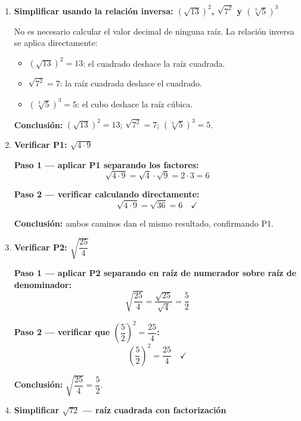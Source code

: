 \documentclass[11pt, letterpaper]{article}
\begin{document}
\begin{tcolorbox}[examplebox, title={Ejemplos}]
\begin{enumerate}[label=\textbf{Ej. \arabic*.}, leftmargin=*, itemsep=18pt]

\item \textbf{Simplificar usando la relación inversa: $(\sqrt{13})^2$, $\sqrt{7^2}$ y $(\sqrt[3]{5})^3$}

No es necesario calcular el valor decimal de ninguna raíz. La relación inversa se aplica directamente:

\medskip
\begin{itemize}[itemsep=4pt]
  \item $(\sqrt{13})^2 = 13$: \quad el cuadrado deshace la raíz cuadrada.
  \item $\sqrt{7^2} = 7$: \quad la raíz cuadrada deshace el cuadrado.
  \item $(\sqrt[3]{5})^3 = 5$: \quad el cubo deshace la raíz cúbica.
\end{itemize}

\textbf{Conclusión:} $(\sqrt{13})^2 = 13$; \quad $\sqrt{7^2} = 7$; \quad $(\sqrt[3]{5})^3 = 5$.

\item \textbf{Verificar P1: $\sqrt{4 \cdot 9}$}

\textbf{Paso 1 — aplicar P1 separando los factores:}
$$\sqrt{4 \cdot 9} = \sqrt{4} \cdot \sqrt{9} = 2 \cdot 3 = 6$$

\textbf{Paso 2 — verificar calculando directamente:}
$$\sqrt{4 \cdot 9} = \sqrt{36} = 6 \quad\checkmark$$

\textbf{Conclusión:} ambos caminos dan el mismo resultado, confirmando P1.

\item \textbf{Verificar P2: $\sqrt{\dfrac{25}{4}}$}

\textbf{Paso 1 — aplicar P2 separando en raíz de numerador sobre raíz de denominador:}
$$\sqrt{\frac{25}{4}} = \frac{\sqrt{25}}{\sqrt{4}} = \frac{5}{2}$$

\textbf{Paso 2 — verificar que $\left(\dfrac{5}{2}\right)^2 = \dfrac{25}{4}$:}
$$\left(\frac{5}{2}\right)^2 = \frac{25}{4} \quad\checkmark$$

\textbf{Conclusión:} $\sqrt{\dfrac{25}{4}} = \dfrac{5}{2}$.

\item \textbf{Simplificar $\sqrt{72}$ — raíz cuadrada con factorización}


\end{enumerate}
\end{tcolorbox}
\end{document}
